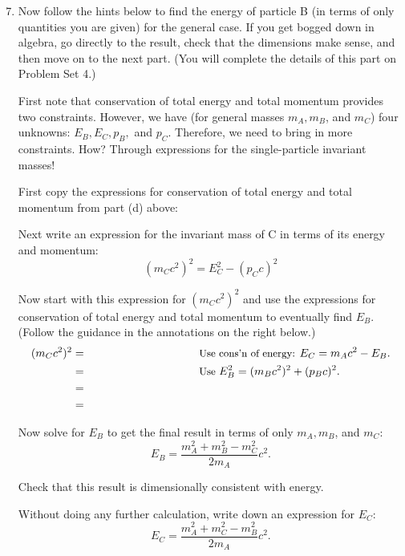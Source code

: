\documentclass[11pt, letterpaper, openany]{book}
\begin{document}
\begin{enumerate}[label=(\alph*)]
\setcounter{enumi}{6}
    \item Now follow the hints below to find the energy of particle B (in terms of only quantities you are given) for the general case. If you get bogged down in algebra, go directly to the result, check that the dimensions make sense, and then move on to the next part. (You will complete the details of this part on Problem Set 4.)
    
    First note that conservation of total energy and total momentum provides two constraints. However, we have (for general masses $m_A, m_B$, and $m_C$) four unknowns: $E_B, E_C, p_B,$ and $p_C$. Therefore, we need to bring in more constraints. How? Through expressions for the single-particle invariant masses!
    
    First copy the expressions for conservation of total energy and total momentum from part (d) above:
    \vspace{2cm}
    
    Next write an expression for the invariant mass of C in terms of its energy and momentum:
    \[ (m_Cc^2)^2 = E_C^2 - (p_Cc)^2 \]
    
    Now start with this expression for $(m_Cc^2)^2$ and use the expressions for conservation of total energy and total momentum to eventually find $E_B$. (Follow the guidance in the annotations on the right below.)
    \begin{align*}
        (m_Cc^2)^2 &= \qquad\qquad\qquad\qquad\qquad \text{\small Use cons'n of energy: } E_C = m_Ac^2 - E_B. \\
                   &= \qquad\qquad\qquad\qquad\qquad \text{\small Use } E_B^2 = (m_Bc^2)^2 + (p_Bc)^2. \\
                   &= \\
                   &=
    \end{align*}
    
    Now solve for $E_B$ to get the final result in terms of only $m_A, m_B$, and $m_C$:
    \begin{equation}
        E_B = \frac{m_A^2 + m_B^2 - m_C^2}{2m_A} c^2.
    \end{equation}
    
    Check that this result is dimensionally consistent with energy.
    
    Without doing any further calculation, write down an expression for $E_C$:
    \begin{equation}
        E_C = \frac{m_A^2 + m_C^2 - m_B^2}{2m_A} c^2.
    \end{equation}
    

\end{enumerate}
\end{document}

